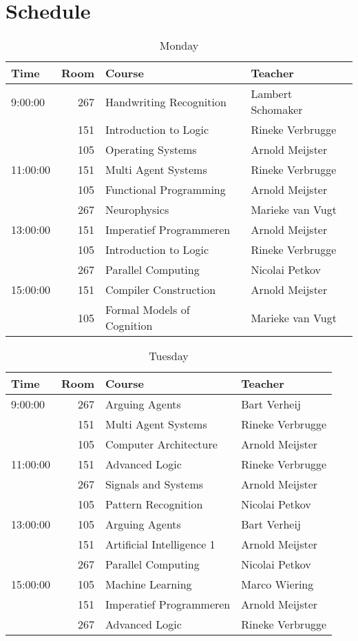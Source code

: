 \section{Schedule}

\begin{table}
    \centering
    \caption{Monday}
    \begin{tabular}{l|r|l|l}
        Time & Room & Course & Teacher \\ \hline
        \hline
        9:00:00 & 267 & Handwriting Recognition & Lambert Schomaker\\
        & 151 & Introduction to Logic & Rineke Verbrugge\\
        & 105 & Operating Systems & Arnold Meijster\\\hline
        11:00:00 & 151 & Multi Agent Systems & Rineke Verbrugge\\
        & 105 & Functional Programming & Arnold Meijster\\
        & 267 & Neurophysics & Marieke van Vugt\\\hline
        13:00:00 & 151 & Imperatief Programmeren & Arnold Meijster\\
        & 105 & Introduction to Logic & Rineke Verbrugge\\
        & 267 & Parallel Computing & Nicolai Petkov\\\hline
        15:00:00 & 151 & Compiler Construction & Arnold Meijster\\
        & 105 & Formal Models of Cognition & Marieke van Vugt\\
    \end{tabular}
\end{table}

\begin{table}
    \centering
    \caption{Tuesday}
    \begin{tabular}{l|r|l|l}
        Time & Room & Course & Teacher \\
        \hline
        \hline
        9:00:00 & 267 & Arguing Agents & Bart Verheij\\
        & 151 & Multi Agent Systems & Rineke Verbrugge\\
        & 105 & Computer Architecture & Arnold Meijster\\\hline
        11:00:00 & 151 & Advanced Logic & Rineke Verbrugge\\
        & 267 & Signals and Systems & Arnold Meijster\\
        & 105 & Pattern Recognition & Nicolai Petkov\\\hline
        13:00:00 & 105 & Arguing Agents & Bart Verheij\\
        & 151 & Artificial Intelligence 1 & Arnold Meijster\\
        & 267 & Parallel Computing & Nicolai Petkov\\\hline
        15:00:00 & 105 & Machine Learning & Marco Wiering\\
        & 151 & Imperatief Programmeren & Arnold Meijster\\
        & 267 & Advanced Logic & Rineke Verbrugge\\
    \end{tabular}
\end{table}

